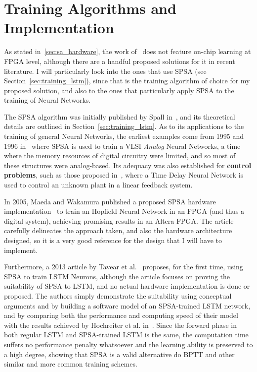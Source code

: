 \section{Training Algorithms and Implementation}\label{sec:sa_training}
As stated in~\ref{sec:sa_hardware}, the work of~\cite{Chang15} does not feature on-chip learning at FPGA level, although there are a handful proposed solutions for it in recent literature. I will particularly look into the ones that use SPSA (see Section~\ref{sec:training_lstm}), since that is the training algorithm of choice for my proposed solution, and also to the ones that particularly apply SPSA to the training of Neural Networks. 

The SPSA algorithm was initially published by Spall in~\cite{Spall98}, and its theoretical details are outlined in Section~\ref{sec:training_lstm}. As to its applications to the training of general Neural Networks, the earliest examples come from 1995 and 1996 in~\cite{Maeda95, Cauwen96} where SPSA is used to train a VLSI \emph{Analog} Neural Networks, a time where the memory resources of digital circuitry were limited, and so most of these structures were analog-based. Its adequacy was also established for \textbf{control problems}, such as those proposed in~\cite{Figueiredo97}, where a Time Delay Neural Network is used to control an unknown plant in a linear feedback system.

In 2005, Maeda and Wakamura published a proposed SPSA hardware implementation~\cite{Maeda05} to train an Hopfield Neural Network in an FPGA (and thus a digital system), achieving promising results in an Altera FPGA. The article carefully delineates the approach taken, and also the hardware architecture designed, so it is a very good reference for the design that I will have to implement. 

Furthermore, a 2013 article by Tavear et al.~\cite{Tavear13} proposes, for the first time, using SPSA to train LSTM Neurons, although the article focuses on proving the suitability of SPSA to LSTM, and no actual hardware implementation is done or proposed. The authors simply demonstrate the suitability using conceptual arguments and by building a software model of an SPSA-trained LSTM network, and by comparing both the performance and computing speed of their model with the results achieved by Hochreiter et al. in~\cite{Hochreiter07}. Since the forward phase in both regular LSTM and SPSA-trained LSTM is the same, the computation time suffers no performance penalty whatsoever and the learning ability is preserved to a high degree, showing that SPSA is a valid alternative do BPTT and other similar and more common training schemes.

